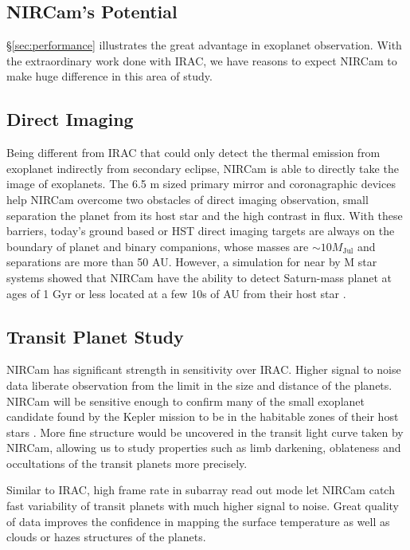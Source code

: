 \documentclass[preprint, 12pt]{aastex}
\begin{document}
\subsection{NIRCam's Potential}
\S \ref{sec:performance} illustrates the great advantage in exoplanet
observation. With the extraordinary work done with IRAC, we have
reasons to expect NIRCam to make huge difference in this area of
study.

\subsection{Direct Imaging}
Being different from IRAC that could only detect the thermal emission
from exoplanet indirectly from secondary eclipse, NIRCam is able to
directly take the image of exoplanets. The 6.5 m sized primary mirror
and coronagraphic devices help NIRCam overcome two obstacles of direct
imaging observation, small separation the planet from its host star
and the high contrast in flux. With these barriers, today's ground
based or HST direct imaging targets are always on the boundary of
planet and binary companions, whose masses are $\sim 10 M_{\mbox{Jul}}$
  and separations are more than 50 AU. However, a simulation for near
  by M star systems showed that NIRCam have the ability to detect
  Saturn-mass planet at ages of 1 Gyr or less located at a few 10s of
  AU from their host star \citep{2012SPIE.8442E..2NB}.

  \subsection{Transit Planet Study}
  NIRCam has significant strength in sensitivity over IRAC. Higher
  signal to noise data liberate observation from the limit in the size
  and distance of the planets. NIRCam will be sensitive enough to
  confirm many of the small exoplanet candidate found by the Kepler
  mission to be in the habitable zones of their host stars
  \citep{2012SPIE.8442E..2NB}. More fine structure would be uncovered
  in the transit light curve taken by NIRCam, allowing us to study
  properties such as limb darkening, oblateness and occultations of
  the transit planets more precisely.

Similar to IRAC, high frame rate in subarray read out mode let NIRCam
catch fast variability of transit planets with much higher signal to
noise. Great quality of data improves the confidence in mapping the
surface temperature as well as clouds or hazes structures of the
planets.
\end{document}
